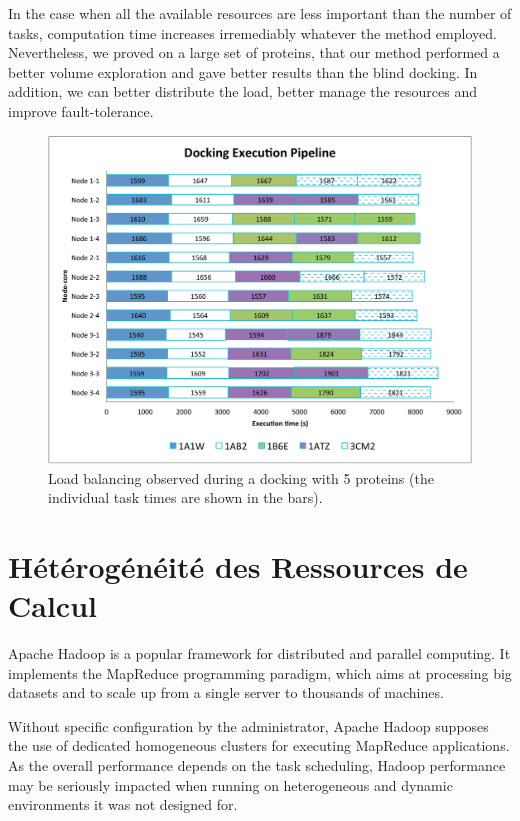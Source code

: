  In the case when all the available resources are less important than the number of tasks, computation time increases irremediably whatever the method employed. Nevertheless, we proved on a large set of proteins, that our method performed a better volume exploration and gave better results than the blind docking. In addition, we can better distribute the load, better manage the resources and improve fault-tolerance.
 
 \begin{figure}[h]
 	\begin{center}
 		\includegraphics[width=0.75\linewidth]{images/Romain/fig8-color} 
 		\caption{Load balancing observed during a docking with 5 proteins (the individual task times are shown in the bars).}\label{fig:balance}\vspace{-0.5cm}
 	\end{center}
 \end{figure} 
 

\section{Hétérogénéité des Ressources de Calcul} \label{sec:intro}

Apache Hadoop is a popular framework for distributed and parallel computing. It implements the MapReduce programming paradigm, which aims at processing big datasets \cite{Dean2008} and to scale up from a single server to thousands of machines. 

Without specific configuration by the administrator, Apache Hadoop supposes the use of dedicated homogeneous clusters for executing MapReduce applications. As the overall performance depends on the task scheduling, Hadoop performance may be seriously impacted when running on heterogeneous and dynamic environments it was not designed for.   

